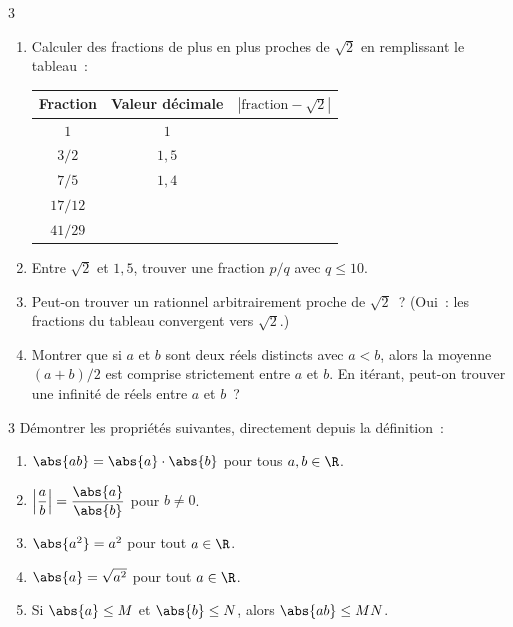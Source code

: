 \begin{exo}{3}
\begin{enumerate}
  \item Calculer des fractions de plus en plus proches de $\sqrt{2}$ en
        remplissant le tableau~:
        \begin{center}
        \renewcommand{\arraystretch}{1.3}
        \begin{tabular}{|c|c|c|}
        \hline
        \rowcolor{BN!10} Fraction & Valeur d\'ecimale & $|\text{fraction}-\sqrt{2}|$ \\ \hline
        $1$ & $1$ & \\
        $3/2$ & $1{,}5$ & \\
        $7/5$ & $1{,}4$ & \\
        $17/12$ & & \\
        $41/29$ & & \\
        \hline
        \end{tabular}
        \end{center}
  \item Entre $\sqrt{2}$ et $1{,}5$, trouver une fraction $p/q$ avec $q \leq 10$.
  \item Peut-on trouver un rationnel arbitrairement proche de $\sqrt{2}$~?
        (Oui~: les fractions du tableau convergent vers $\sqrt{2}$.)
  \item Montrer que si $a$ et $b$ sont deux r\'eels distincts avec $a < b$,
        alors la moyenne $(a+b)/2$ est comprise strictement entre $a$ et $b$.
        En it\'erant, peut-on trouver une infinit\'e de r\'eels entre $a$ et $b$~?
\end{enumerate}
\end{exo}

\begin{exo}{3}
D\'emontrer les propri\'et\'es suivantes, directement depuis la d\'efinition~:
\begin{enumerate}
  \item $\abs{ab} = \abs{a}\cdot\abs{b}$ pour tous $a,b \in \R$.
  \item $\left|\dfrac{a}{b}\right| = \dfrac{\abs{a}}{\abs{b}}$ pour $b\ne0$.
  \item $\abs{a^2} = a^2$ pour tout $a\in\R$.
  \item $\abs{a} = \sqrt{a^2}$ pour tout $a\in\R$.
  \item Si $\abs{a}\leq M$ et $\abs{b}\leq N$, alors $\abs{ab}\leq MN$.
\end{enumerate}
\end{exo}


